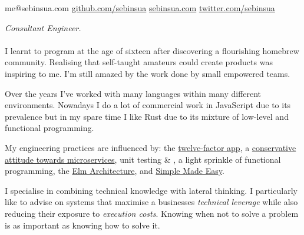 \documentclass[10pt,a4paper]{article}
\begin{document}
\sloppy  %


\nobreakvspace{0.3em}  %

\noindent
me@sebinsua.com\sbull
\href{http://github.com/sebinsua}{github.com/sebinsua}\sbull
\href{http://sebinsua.com}{sebinsua.com}\sbull
\href{http://twitter.com/sebinsua}{twitter.com/sebinsua}

\spacedhrule{0.9em}{-0.4em}  %


\vspace{-1.3em}  %
\begin{multicols}{2}  %
\noindent \emph{Consultant Engineer.}
\\
\\
I learnt to program at the age of sixteen after discovering a flourishing homebrew community. Realising that self-taught amateurs could create products was inspiring to me. I’m still amazed by the work done by small empowered teams.\newline

Over the years I've worked with many languages within many different environments. Nowadays I do a lot of commercial work in JavaScript due to its prevalence but in my spare time I like Rust due to its mixture of low-level and functional programming.

My engineering practices are influenced by: the \href{http://12factor.net}{twelve-factor app}, a \href{https://www.tigerteam.dk/2014/micro-services-its-not-only-the-size-that-matters-its-also-how-you-use-them-part-2/}{conservative attitude towards microservices}, unit testing \& , a light sprinkle of functional programming, the \href{https://github.com/evancz/elm-architecture-tutorial/}{Elm Architecture}, and \href{http://infoq.com/presentations/Simple-Made-Easy}{Simple Made Easy}.

I specialise in combining technical knowledge with lateral thinking. I particularly like to advise on systems that maximise a businesses \emph{technical leverage} while also reducing their exposure to \emph{execution costs}. Knowing when not to solve a problem is as important as knowing how to solve it.

\end{multicols}
\end{document}
